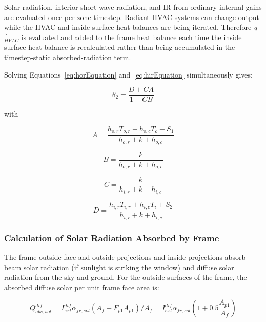 Solar radiation, interior short-wave radiation, and IR from ordinary internal gains are evaluated once per zone timestep. Radiant HVAC systems can change output while the HVAC and inside surface heat balances are being iterated. Therefore \emph{q\(^{\prime\prime}_{HVAC}\)} is evaluated and added to the frame heat balance each time the inside surface heat balance is recalculated rather than being accumulated in the timestep-static absorbed-radiation term.

Solving Equations~\ref{eq:horEquation} and~\ref{eq:hirEquation} simultaneously gives:

\begin{equation}
{\theta_2} = \frac{{D + CA}}{{1 - CB}}
\end{equation}

with

\begin{equation}
A = \frac{{{h_{o,r}}{T_{o,r}} + {h_{o,c}}{T_o} + {S_1}}}{{{h_{o,r}} + k + {h_{o,c}}}}
\end{equation}

\begin{equation}
B = \frac{k}{{{h_{o,r}} + k + {h_{o,c}}}}
\end{equation}

\begin{equation}
C = \frac{k}{{{h_{i,r}} + k + {h_{i,c}}}}
\end{equation}

\begin{equation}
D = \frac{{{h_{i,r}}{T_{i,r}} + {h_{i,c}}{T_i} + {S_2}}}{{{h_{i,r}} + k + {h_{i,c}}}}
\end{equation}

\subsubsection{Calculation of Solar Radiation Absorbed by Frame}\label{calculation-of-solar-radiation-absorbed-by-frame}

The frame outside face and outside projections and inside projections absorb beam solar radiation (if sunlight is striking the window) and diffuse solar radiation from the sky and ground. For the outside surfaces of the frame, the absorbed diffuse solar per unit frame face area is:

\begin{equation}
Q_{abs,sol}^{dif} = I_{ext}^{dif}{\alpha_{fr,sol}}\left( {{A_f} + {F_{p1}}{A_{p1}}} \right)/{A_f} = I_{ext}^{dif}{\alpha_{fr,sol}}\left( {1 + 0.5\frac{{{A_{p1}}}}{{{A_f}}}} \right)
\end{equation}

